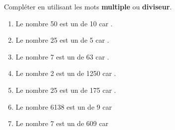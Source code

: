 \documentclass[exercice]{thedocument}%
\begin{document}
%
Compléter en utilisant les mots {\bfseries multiple} ou {\bfseries diviseur}.
\begin{enumerate}
    \item Le nombre 50 est un  de 10 car .
    \item Le nombre 25 est un  de 5 car .
    \item Le nombre 7 est un  de 63 car .
    \item Le nombre 2 est un  de 1250 car .
    \item Le nombre 25 est un  de 175 car .
    \item Le nombre 6138 est un  de 9 car 
    \item Le nombre 7 est un  de 609 car 
\end{enumerate}
\end{document}
